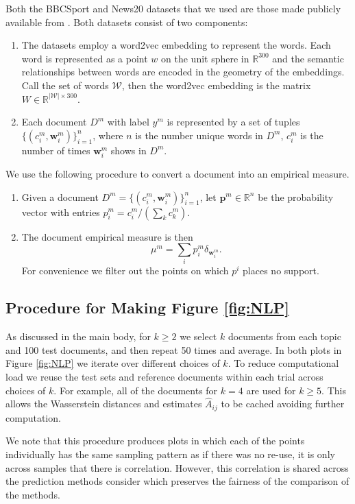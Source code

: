 \documentclass[nohyperref]{article}
\theoremstyle{definition}
\begin{document}
Both the BBCSport and News20 datasets that we used are those made publicly available from \cite{huang2016supervised}. Both datasets consist of two components:
\begin{enumerate}
    \item The datasets employ a word2vec \cite{mikolov2013distributed} embedding to represent the words. Each word is  represented as a point $w$ on the unit sphere in $\mathbb{R}^{300}$ and the semantic relationships between words are encoded in the geometry of the embeddings. Call the set of words $\mathcal{W}$, then the word2vec embedding is the matrix $W \in \mathbb{R}^{|\mathcal{W}| \times 300}$.
    \item Each document $D^m$ with label $y^m$ is represented by a set of tuples $\{(c^m_i,\bm w^m_i)\}_{i=1}^n$, where $n$ is the number unique words in $D^m$, $c^m_i$ is the number of times $\bm w^m_i$ shows in $D^m$.
\end{enumerate}
We use the following procedure to convert a document into an empirical measure.
\begin{enumerate}
    \item Given a document $D^m = \{(c^m_i,\bm w^m_i)\}_{i=1}^n$, let $\bm p^m \in \mathbb{R}^n$ be the probability vector with entries $p^m_i = c^m_i / (\sum_{k} c^m_k)$. 
    \item The document empirical measure is then
    $$\mu^m = \sum_{i} p^m_i \delta_{\bm w^m_i}.$$
    For convenience we filter out the points on which $p^i$ places no support.
\end{enumerate}

\subsection{Procedure for Making Figure \ref{fig:NLP}} \label{sec:NLP_figs}

As discussed in the main body, for $k \geq 2$ we select $k$ documents from each topic and 100 test documents, and then repeat 50 times and average. In both plots in Figure \ref{fig:NLP} we iterate over different choices of $k$. To reduce computational load we reuse the test sets and reference documents within each trial across choices of $k$. For example, all of the documents for $k=4$ are used for $k \geq 5$. This allows the Wasserstein distances and estimates $\hat{A}_{ij}$ to be cached avoiding further computation.

We note that this procedure produces plots in which each of the points individually has the same sampling pattern as if there was no re-use, it is only across samples that there is correlation. However, this correlation is shared across the prediction methods consider which preserves the fairness of the comparison of the methods.
\end{document}
